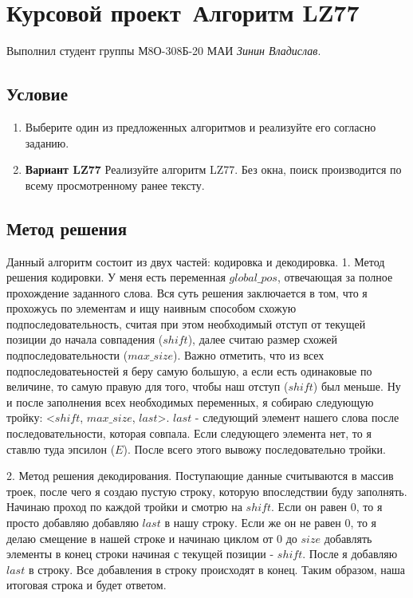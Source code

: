 \documentclass[12pt]{article}
\begin{document}
    \section*{Курсовой проект\, Алгоритм LZ77}

    Выполнил студент группы М8О-308Б-20 МАИ \textit{Зинин Владислав}.

    \subsection*{Условие}
 
    \begin{enumerate}
    \item Выберите один из предложенных алгоритмов и реализуйте его согласно заданию.
    \item \textbf{Вариант LZ77} Реализуйте алгоритм LZ77. Без окна, поиск производится по всему просмотренному ранее тексту.
    \end{enumerate}

    \subsection*{Метод решения}

    Данный алгоритм состоит из двух частей: кодировка и декодировка.
    1. Метод решения кодировки. У меня есть переменная $global\_pos$, отвечающая за полное прохождение заданного слова. Вся суть решения заключается в том,
    что я прохожусь по элементам и ищу наивным способом схожую подпоследовательность, считая при этом необходимый отступ от текущей позиции до начала совпадения ($shift$),
    далее считаю размер схожей подпоследовательности ($max\_size$). Важно отметить, что из всех подпоследоватеьностей я беру самую большую, а если есть одинаковые по величине, то самую правую
    для того, чтобы наш отступ ($shift$) был меньше. Ну и после заполнения всех необходимых переменных, я собираю следующую тройку: <$shift$, $max\_size$, $last$>. $last$ - следующий элемент нашего слова после последовательности, которая совпала. Если
    следующего элемента нет, то я ставлю туда эпсилон ($E$). После всего этого вывожу последовательно тройки.

    2. Метод решения декодирования. Поступающие данные считываются в массив троек, после чего я создаю пустую строку, которую впоследствии буду заполнять. Начинаю проход
    по каждой тройки и смотрю на $shift$. Если он равен 0, то я просто добавляю добавляю $last$ в нашу строку. Если же он не равен 0, то я делаю смещение в нашей строке и начинаю
    циклом от 0 до $size$ добавлять элементы в конец строки начиная с текущей позиции - $shift$. После я добавляю $last$ в строку. Все добавления в строку происходят в конец. Таким образом,
    наша итоговая строка и будет ответом.
\end{document}

